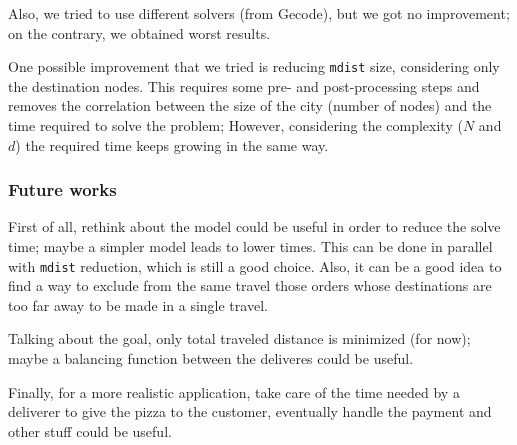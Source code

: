 \documentclass[10pt]{article}
\begin{document}
	Also, we tried to use different solvers (from Gecode), but we got no improvement; 
	on the contrary, we obtained worst results.

	One possible improvement that we tried is reducing \texttt{mdist} size, considering
	only the destination nodes.
	This requires some pre- and post-processing steps and removes the correlation between
	the size of the city (number of nodes) and the time required to solve the problem; 
	However, considering the complexity ($N$ and $d$) the required time keeps growing 
	in the same way.


	\subsubsection*{Future works}
	\label{Future work}

	First of all, rethink about the model could be useful in order to reduce the solve time; 
	maybe a simpler model leads to 
	lower times. This can be done in parallel with \texttt{mdist} reduction, which is still 
	a good choice. Also, it can be a good idea to find a way to exclude from the same travel 
	those orders whose destinations are too far away to be made in a single travel.

	Talking about the goal, only total traveled distance is minimized (for now); maybe a balancing 
	function between the deliveres could be useful.

	Finally, for a more realistic application, take care of the time 
	needed by a deliverer to give the pizza to the customer, eventually handle 
	the payment and other stuff could be useful.
	
	
\end{document}
